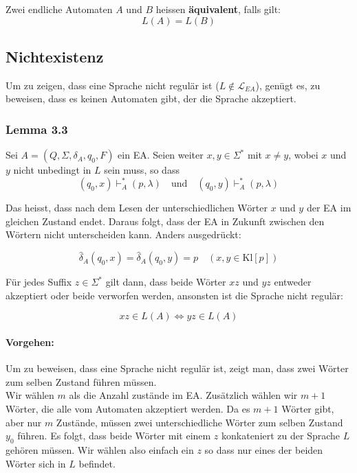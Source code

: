\documentclass[11pt]{article}
\begin{document}
Zwei endliche Automaten $A$ und $B$ heissen \textbf{{\"a}quivalent}, falls gilt:
\begin{equation*}
	L(A) = L(B)
\end{equation*}

\subsection{Nichtexistenz}

Um zu zeigen, dass eine Sprache nicht regul{\"a}r ist ($L \notin \mathcal{L}_{EA}$), gen{\"u}gt es, zu beweisen, dass es keinen Automaten gibt, der die Sprache akzeptiert.

\subsubsection{Lemma 3.3}

Sei $A = (Q, \Sigma, \delta_A, q_0, F)$ ein EA. Seien weiter $x,y \in \Sigma^*$ mit $x \neq y$, wobei $x$ und $y$ nicht unbedingt in $L$ sein muss, so dass
\begin{equation*}
	(q_0, x) \vdash_A^* (p, \lambda)\quad\text{und}\quad (q_0, y) \vdash_A^* (p, \lambda)
\end{equation*}

Das heisst, dass nach dem Lesen der unterschiedlichen Wörter $x$ und $y$ der EA im gleichen Zustand endet. Daraus folgt, dass der EA in Zukunft zwischen den Wörtern nicht unterscheiden kann. Anders ausgedr{\"u}ckt:

\begin{equation*}
	\hat\delta_A(q_0, x) = \hat\delta_A(q_0, y) = p \quad (x, y \in \text{Kl}[p])
\end{equation*}

F{\"u}r jedes Suffix $z \in \Sigma^*$ gilt dann, dass beide Wörter $xz$ und $yz$ entweder akzeptiert oder beide verworfen werden, ansonsten ist die Sprache nicht regul{\"a}r:

\begin{equation*}
	xz \in L(A) \Leftrightarrow yz \in L(A)
\end{equation*}

\paragraph{Vorgehen:} Um zu beweisen, dass eine Sprache nicht regul{\"a}r ist, zeigt man, dass zwei Wörter zum selben Zustand f{\"u}hren m{\"u}ssen. \\
Wir w{\"a}hlen $m$ als die Anzahl zust{\"a}nde im EA. Zus{\"a}tzlich w{\"a}hlen wir $m+1$ Wörter, die alle vom Automaten akzeptiert werden. Da es $m+1$ Wörter gibt, aber nur $m$ Zust{\"a}nde, m{\"u}ssen zwei unterschiedliche Wörter zum selben Zustand $y_0$ f{\"u}hren. Es folgt, dass beide Wörter mit einem $z$ konkateniert zu der Sprache $L$ gehören m{\"u}ssen. Wir w{\"a}hlen also einfach ein $z$ so dass nur eines der beiden Wörter sich in $L$ befindet.
\end{document}
